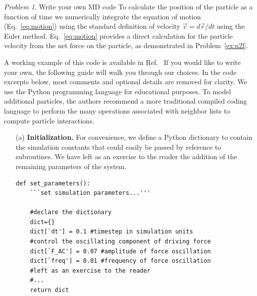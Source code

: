 \documentclass[preprint,showpacs,preprintnumbers,amsmath,amssymb,aps,prb]{revtex4-1}
\theoremstyle{remark}
\newtheorem{problem}{Problem}
\begin{document}
\begin{problem}{Write your own MD code}
  \label{ex:euler}
  To calculate the position of the particle
  as a function of time
  we
  numerically integrate the equation of motion
  (Eq.~\ref{eq:motion})
  using
  the standard definition of velocity
  $\vec{v} = d\vec{r}/dt$ 
  using the 
  Euler method.
  Eq.~\ref{eq:motion} provides
  a direct calculation for the particle velocity
  from the net force on the particle,
  as demonstrated in Problem~\ref{ex:n2l}.

    A working example of this code is available
  in Ref.~\cite{supplemental}
  If you would like to write your own,
  the following guide
  will walk you through our choices.
  In the code excerpts below,
  most comments and optional details are removed for clarity.
  We use the Python programming
  language
  for educational purposes.
  To model additional particles,
  the authors recommend a more traditional 
  compiled coding language
  to perform the many operations associated
  with neighbor lists to compute particle interactions.
  
  \begin{enumerate}
    
  \item[(a)] {\bf Initialization.}
    For convenience,
    we define a Python dictionary
    to contain the simulation constants
    that could easily be passed by reference
    to subroutines.
    We have left as an exercise to the reader the addition
    of the remaining parameters of the system.
    \begin{verbatim}
def set_parameters():           
    ```set simulation parameters...'''

    #declare the dictionary     
    dict={}  
    dict[`dt'] = 0.1 #timestep in simulation units
    #control the oscillating component of driving force
    dict[`F_AC'] = 0.07 #amplitude of force oscillation
    dict[`freq'] = 0.01 #frequency of force oscillation
    #left as an exercise to the reader
    #...
    return dict


\end{verbatim}
\end{enumerate}
\end{problem}
\end{document}
